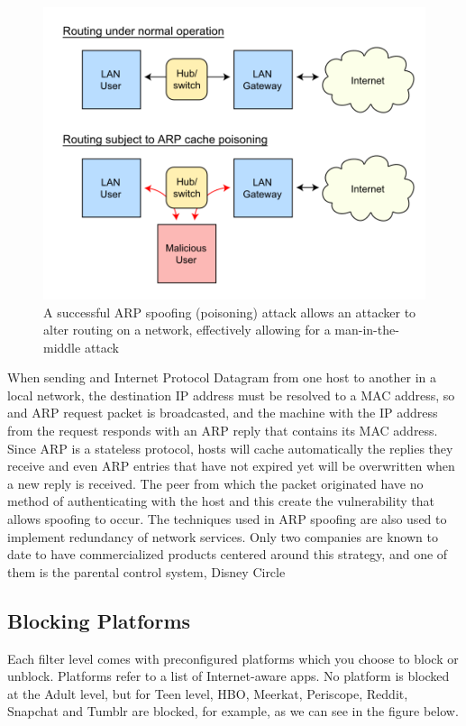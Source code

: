 \begin{figure}[th]
\centering
\includegraphics[width=1\textwidth]{Figures/arp-spoofing}
\decoRule
\caption{A successful ARP spoofing (poisoning) attack allows an attacker to alter routing on a network, effectively allowing for a man-in-the-middle attack}
\label{fig:circle}
\end{figure}

When sending and Internet Protocol Datagram from one host to another in a local network, the destination IP address must be resolved to a MAC address, so and ARP request packet is broadcasted, and the machine with the IP address from the request responds with an ARP reply that contains its MAC address. Since ARP is a stateless protocol, hosts will cache automatically the replies they receive and even ARP entries that have not expired yet will be overwritten when a new reply is received. The peer from which the packet originated have no method of authenticating with the host and this create the vulnerability that allows spoofing to occur. The techniques used in ARP spoofing are also used to implement redundancy of network services. Only two companies are known to date to have commercialized products centered around this strategy, and one of them is the parental control system, Disney Circle

\subsection{Blocking Platforms}

Each filter level comes with preconfigured platforms which you choose to block or unblock. Platforms refer to a list of Internet-aware apps. No platform is blocked at the Adult level, but for Teen level, HBO, Meerkat, Periscope, Reddit, Snapchat and Tumblr are blocked, for example, as we can see in the figure below. \parencite{circleMashable}

